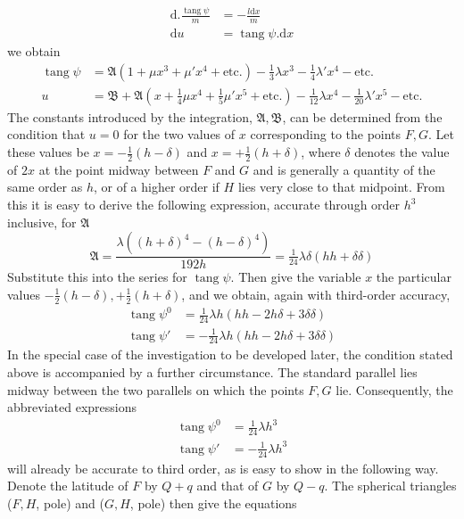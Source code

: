 %
\[
\begin{aligned}
\mathrm{d}\mathord{.}\frac{\operatorname{tang}\psi}{m}&=-\frac{l\mathrm{d}x}{m}\\
\mathrm{d}u&=\operatorname{tang}\psi\mathord{.}\mathrm{d}x
\end{aligned}
\]
we obtain
\[
\begin{aligned}
\operatorname{tang}\psi&=\mathfrak{A}(1+\mu x^3+\mu'x^4+\text{etc.})-\tfrac{1}{3}\lambda x^3-\tfrac{1}{4}\lambda'x^4-\text{etc.}\\
u&=\mathfrak{B}+\mathfrak{A}(x+\tfrac{1}{4}\mu x^4+\tfrac{1}{5}\mu'x^5+\text{etc.})-\tfrac{1}{12}\lambda x^4-\tfrac{1}{20}\lambda'x^5-\text{etc.}
\end{aligned}
\]
\indent The constants introduced by the integration, \(\mathfrak{A},\mathfrak{B}\), can be determined from the condition that \(u=0\) for the two values of \(x\) corresponding to the points \(F,G\). Let these values be \(x=-\tfrac{1}{2}(h-\delta)\) and \(x=+\tfrac{1}{2}(h+\delta)\), where \(\delta\) denotes the value of \(2x\) at the point midway between \(F\) and \(G\) and is generally a quantity of the same order as \(h\), or of a higher order if \(H\) lies very close to that midpoint. From this it is easy to derive the following expression, accurate through order \(h^3\) inclusive, for \(\mathfrak{A}\)
\[
\mathfrak{A}=\frac{\lambda((h+\delta)^4-(h-\delta)^4)}{192h}=\tfrac{1}{24}\lambda\delta(hh+\delta\delta)
\]
\indent Substitute this into the series for \(\operatorname{tang}\psi\). Then give the variable \(x\) the particular values \(-\tfrac{1}{2}(h-\delta),+\tfrac{1}{2}(h+\delta)\), and we obtain, again with third-order accuracy,
\[
\begin{aligned}
\operatorname{tang}\psi^0&=\tfrac{1}{24}\lambda h(hh-2h\delta+3\delta\delta)\\
\operatorname{tang}\psi'&=-\tfrac{1}{24}\lambda h(hh-2h\delta+3\delta\delta)
\end{aligned}
\]
\indent In the special case of the investigation to be developed later, the condition stated above is accompanied by a further circumstance. The standard parallel lies midway between the two parallels on which the points \(F,G\) lie. Consequently, the abbreviated expressions
\[
\begin{aligned}
\operatorname{tang}\psi^0&=\tfrac{1}{24}\lambda h^3\\
\operatorname{tang}\psi'&=-\tfrac{1}{24}\lambda h^3
\end{aligned}
\]
will already be accurate to third order, as is easy to show in the following way. Denote the latitude of \(F\) by \(Q+q\) and that of \(G\) by \(Q-q\). The spherical triangles (\(F,H\), pole) and (\(G,H\), pole) then give the equations
